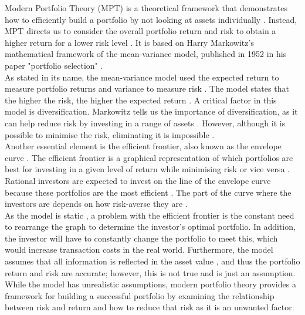 \documentclass[12pt]{report}
\begin{document}
Modern Portfolio Theory (MPT) is a theoretical framework that demonstrates how to efficiently build a portfolio by not looking at assets individually \cite{source5}. Instead, MPT directs us to consider the overall portfolio return and risk to obtain a higher return for a lower risk level \cite{source5}. It is based on Harry Markowitz's mathematical framework of the mean-variance model, published in 1952 in his paper "portfolio selection" \cite{10.2307/2975974, source5}.
\\ \newline \noindent
As stated in its name, the mean-variance model used the expected return to measure portfolio returns and variance to measure risk \cite{elbannan2015capital,10.2307/2975974}. The model states that the higher the risk, the higher the expected return \cite{textbook}. A critical factor in this model is diversification. Markowitz tells us the importance of diversification, as it can help reduce risk by investing in a range of assets \cite{10.2307/2975974}. However, although it is possible to minimise the risk, eliminating it is impossible \cite{10.2307/2975974}.
\\ \newline \noindent
Another essential element is the efficient frontier, also known as the envelope curve \cite{elbannan2015capital}. The efficient frontier is a graphical representation of which portfolios are best for investing in a given level of return while minimising risk or vice versa \cite{textbook, source6}. Rational investors are expected to invest on the line of the envelope curve because these portfolios are the most efficient \cite{textbook}. The part of the curve where the investors are depends on how risk-averse they are \cite{textbook, source6}.
\\ \newline \noindent
As the model is static \cite{elbannan2015capital}, a problem with the efficient frontier is the constant need to rearrange the graph to determine the investor's optimal portfolio. In addition, the investor will have to constantly change the portfolio to meet this, which would increase transaction costs in the real world. Furthermore, the model assumes that all information is reflected in the asset value \cite{elbannan2015capital, textbook, 10.2307/2975974}, and thus the portfolio return and risk are accurate; however, this is not true and is just an assumption. 
\\ \newline \noindent
While the model has unrealistic assumptions, modern portfolio theory provides a framework for building a successful portfolio by examining the relationship between risk and return and how to reduce that risk as it is an unwanted factor.
\end{document}

